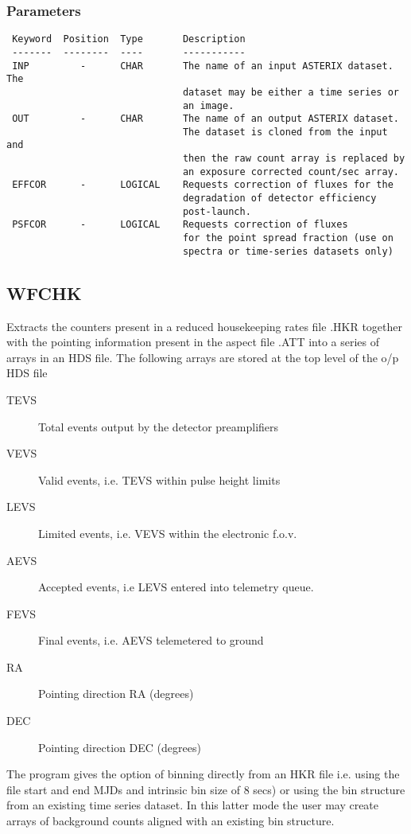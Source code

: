 \documentclass{book}
\renewcommand{\_}{{\tt\char'137}}     %
\begin{document}
\subsubsection{Parameters}
\begin{verbatim}
 Keyword  Position  Type       Description
 -------  --------  ----       -----------
 INP         -      CHAR       The name of an input ASTERIX dataset. The
                               dataset may be either a time series or
                               an image.
 OUT         -      CHAR       The name of an output ASTERIX dataset.
                               The dataset is cloned from the input and
                               then the raw count array is replaced by
                               an exposure corrected count/sec array.
 EFFCOR      -      LOGICAL    Requests correction of fluxes for the
                               degradation of detector efficiency
                               post-launch.
 PSFCOR      -      LOGICAL    Requests correction of fluxes
                               for the point spread fraction (use on
                               spectra or time-series datasets only)
\end{verbatim}\subsection{WFCHK}
Extracts the counters present in a reduced housekeeping rates file
.HKR together with the pointing information present in the aspect
file .ATT into a series of arrays in an HDS file.
The following arrays are stored at the top level of the o/p HDS file

\begin{description}
\item[TEVS]
Total events output by the detector preamplifiers
\item[VEVS]
Valid events, i.e. TEVS within pulse height limits
\item[LEVS]
Limited events, i.e. VEVS within the electronic f.o.v.
\item[AEVS]
Accepted events, i.e LEVS entered into telemetry queue.
\item[FEVS]
Final events, i.e. AEVS telemetered to ground
\item[RA]
Pointing direction RA (degrees)
\item[DEC]
Pointing direction DEC (degrees)
\end{description}
The program gives the option of binning directly from an HKR file {i.e.}
using the file start and end MJDs and intrinsic bin size of 8 secs) or
using the bin structure from an existing time series dataset.
In this latter mode the user may create arrays of background counts
aligned with an existing bin structure.
\end{document}
